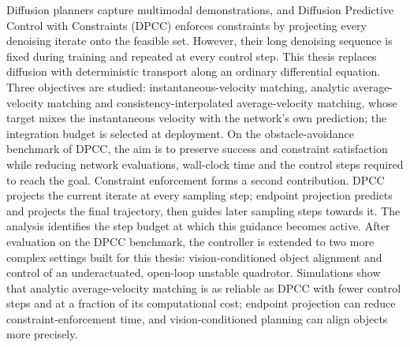 \ifstandalone
Diffusion planners capture multimodal demonstrations, and Diffusion Predictive Control with
Constraints (DPCC) enforces constraints by projecting every denoising iterate onto the feasible set.
However, their long denoising sequence is fixed during training and repeated at every control step.
This thesis replaces diffusion with deterministic transport along an ordinary differential equation.
Three objectives are studied: instantaneous-velocity matching, analytic average-velocity matching and
consistency-interpolated average-velocity matching, whose target mixes the instantaneous velocity with
the network's own prediction; the integration budget is selected at deployment. On the
obstacle-avoidance benchmark of DPCC, the aim is to preserve success and
constraint satisfaction while reducing network evaluations, wall-clock time and the control steps
required to reach the goal. Constraint enforcement forms a second contribution. DPCC projects the
current iterate at every sampling step; endpoint projection predicts and projects the final trajectory,
then guides later sampling steps towards it. The analysis identifies the step budget at which this
guidance becomes active. After evaluation on the DPCC benchmark, the controller is extended to two
more complex settings built for this thesis: vision-conditioned object alignment and control of an
underactuated, open-loop unstable quadrotor. Simulations show that analytic average-velocity
matching is as reliable as DPCC with fewer control steps and at a fraction of its
computational cost; endpoint projection can reduce constraint-enforcement time, and
vision-conditioned planning can align objects more precisely.
\fi
{}

\tableofcontents{}

\mainmatter{}

